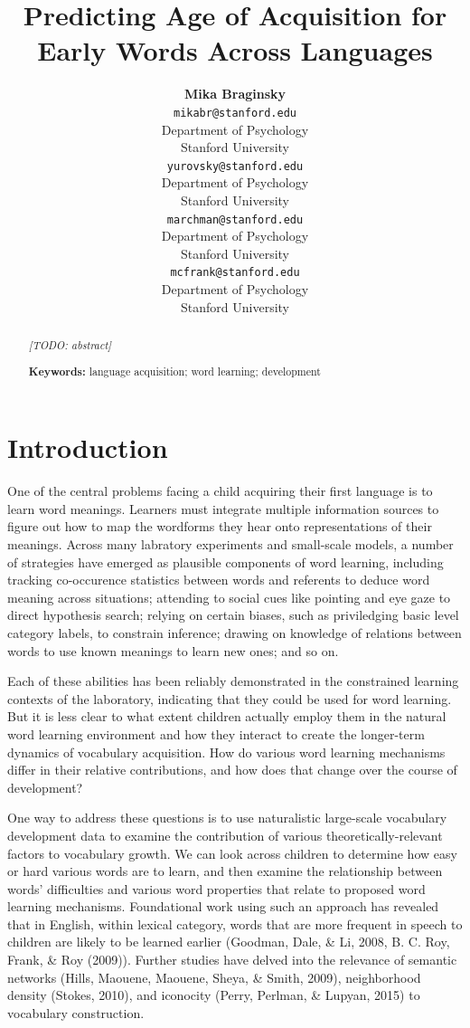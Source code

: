 \documentclass[10pt, letterpaper]{article}
\title{Predicting Age of Acquisition for Early Words Across Languages}
\author{{\large \bf Mika Braginsky} \\ \texttt{mikabr@stanford.edu} \\ Department of Psychology \\ Stanford University \And {\large \bf Daniel Yurovsky} \\ \texttt{yurovsky@stanford.edu} \\ Department of Psychology \\ Stanford University \And {\large \bf Virginia A. Marchman} \\ \texttt{marchman@stanford.edu} \\ Department of Psychology \\ Stanford University \And {\large \bf Michael C. Frank} \\ \texttt{mcfrank@stanford.edu} \\ Department of Psychology \\ Stanford University}
\begin{document}
\maketitle

\begin{abstract}
\emph{{[}TODO: abstract{]}}

\textbf{Keywords:}
language acquisition; word learning; development
\end{abstract}

\section{Introduction}\label{introduction}

One of the central problems facing a child acquiring their first
language is to learn word meanings. Learners must integrate multiple
information sources to figure out how to map the wordforms they hear
onto representations of their meanings. Across many labratory
experiments and small-scale models, a number of strategies have emerged
as plausible components of word learning, including tracking
co-occurence statistics between words and referents to deduce word
meaning across situations; attending to social cues like pointing and
eye gaze to direct hypothesis search; relying on certain biases, such as
priviledging basic level category labels, to constrain inference;
drawing on knowledge of relations between words to use known meanings to
learn new ones; and so on.

Each of these abilities has been reliably demonstrated in the
constrained learning contexts of the laboratory, indicating that they
could be used for word learning. But it is less clear to what extent
children actually employ them in the natural word learning environment
and how they interact to create the longer-term dynamics of vocabulary
acquisition. How do various word learning mechanisms differ in their
relative contributions, and how does that change over the course of
development?

One way to address these questions is to use naturalistic large-scale
vocabulary development data to examine the contribution of various
theoretically-relevant factors to vocabulary growth. We can look across
children to determine how easy or hard various words are to learn, and
then examine the relationship between words' difficulties and various
word properties that relate to proposed word learning mechanisms.
Foundational work using such an approach has revealed that in English,
within lexical category, words that are more frequent in speech to
children are likely to be learned earlier (Goodman, Dale, \& Li, 2008,
B. C. Roy, Frank, \& Roy (2009)). Further studies have delved into the
relevance of semantic networks (Hills, Maouene, Maouene, Sheya, \&
Smith, 2009), neighborhood density (Stokes, 2010), and iconocity (Perry,
Perlman, \& Lupyan, 2015) to vocabulary construction.
\end{document}
